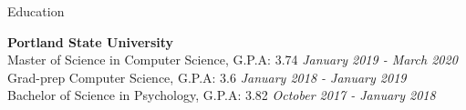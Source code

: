 \documentclass{resume} %
\begin{document}

\begin{rSection}{Education}

{\bf Portland State University} 
  \\ Master of Science in Computer Science, { G.P.A: 3.74 }\hfill {\em January 2019 - March 2020}  
\\ Grad-prep Computer Science, { G.P.A: 3.6 }\hfill {\em January 2018 - January 2019}  
\\ Bachelor of Science in Psychology, { G.P.A: 3.82 }\hfill {\em October 2017 - January 2018}  


\end{rSection}
\end{document}
